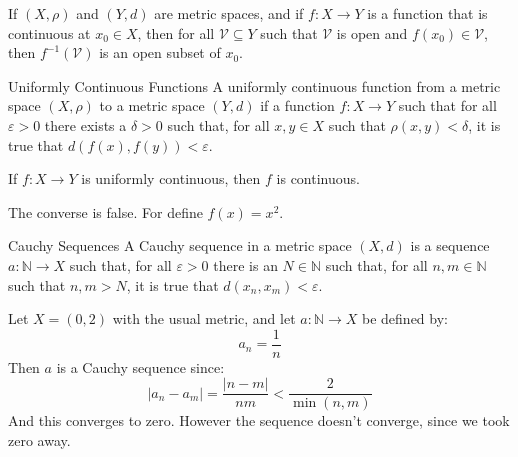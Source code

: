 \documentclass[crop=false,class=article,oneside]{standalone}
\begin{document}
            \begin{theorem}
                If $(X,\rho)$ and $(Y,d)$ are metric spaces, and if
                $f:X\rightarrow{Y}$ is a function that is
                continuous at $x_{0}\in{X}$, then for
                all $\mathcal{V}\subseteq{Y}$ such that
                $\mathcal{V}$ is open and $f(x_{0})\in\mathcal{V}$,
                then $f^{-1}(\mathcal{V})$ is an open subset
                of $x_{0}$.
            \end{theorem}
            \begin{ldefinition}{Uniformly Continuous Functions}
                A uniformly continuous function from a metric space
                $(X,\rho)$ to a metric space $(Y,d)$ if a function
                $f:X\rightarrow{Y}$ such that for all
                $\varepsilon>0$ there exists a $\delta>0$ such
                that, for all $x,y\in{X}$ such that
                $\rho(x,y)<\delta$, it is true that
                $d(f(x),f(y))<\varepsilon$.
            \end{ldefinition}
            \begin{theorem}
                If $f:X\rightarrow{Y}$ is uniformly continuous,
                then $f$ is continuous.
            \end{theorem}
            The converse is false. For define $f(x)=x^{2}$.
            \begin{ldefinition}{Cauchy Sequences}
                A Cauchy sequence in a metric space $(X,d)$ is a
                sequence $a:\mathbb{N}\rightarrow{X}$ such that,
                for all $\varepsilon>0$ there is an
                $N\in\mathbb{N}$ such that, for all
                $n,m\in\mathbb{N}$ such that $n,m>N$,
                it is true that $d(x_{n},x_{m})<\varepsilon$.
            \end{ldefinition}
            \begin{lexample}
                Let $X=(0,2)$ with the usual metric, and let
                $a:\mathbb{N}\rightarrow{X}$ be defined by:
                \begin{equation}
                    a_{n}=\frac{1}{n}
                \end{equation}
                Then $a$ is a Cauchy sequence since:
                \begin{equation}
                    |a_{n}-a_{m}|=\frac{|n-m|}{nm}
                    <\frac{2}{\min(n,m)}
                \end{equation}
                And this converges to zero. However the sequence
                doesn't converge, since we took zero away.
            \end{lexample}
\end{document}
